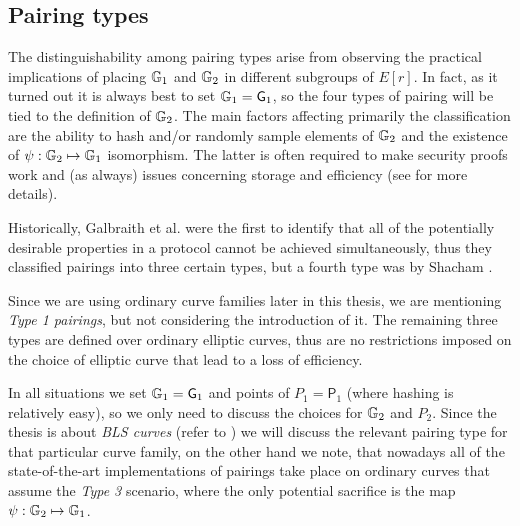 

\subsection{Pairing types}
\label{ssec:ch1.ellipticcurvesaspairinggroups.pairingtypes}


The distinguishability among pairing types arise from observing the practical
implications of placing $\mathbb{G}_1$ and $\mathbb{G}_2$ in different subgroups of $E[r]$.  In 
fact, as it turned out \cite{theory.pairings.for.beginners} it is always best to set
$\mathbb{G}_1 = \mathsf{G}_1$, so the four types of pairing will be tied to the definition of
$\mathbb{G}_2$. The main factors affecting primarily the classification are the ability to hash and/or randomly sample elements of $\mathbb{G}_2$ and the existence of $\psi : \mathbb{G}_2 \mapsto \mathbb{G}_1$ isomorphism. The latter is often required to make security proofs work and (as always) issues concerning storage and efficiency (see \cite{GPS08} for more details).

Historically, Galbraith et al. \cite{GPS08} were the first to identify that all of the potentially desirable properties in a protocol cannot be achieved simultaneously, thus they classified pairings into three certain types, but a fourth type was by Shacham \cite{Sha05}.

Since we are using ordinary curve families later in this thesis, we are mentioning \textit{Type 1 pairings}, but not considering the introduction of it. The remaining three types are defined over ordinary elliptic curves, thus are no restrictions imposed on the choice of elliptic curve that lead to a loss of efficiency.

In all situations we set $\mathbb{G}_1 = \mathsf{G}_1$ and points of $P_1 = \mathsf{P}_1$ (where hashing is relatively easy), so we only need to discuss the choices for $\mathbb{G}_2$ and $P_2$. Since the thesis is about \textit{BLS curves} (refer to ) we will discuss the relevant pairing type for that particular curve family, on the other hand we note, that nowadays all of the state-of-the-art implementations of pairings take place on ordinary curves that assume the \textit{Type 3} scenario, where the only potential sacrifice is the map $\psi : \mathbb{G}_2 \mapsto \mathbb{G}_1$. 


